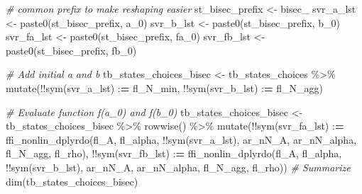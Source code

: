 \documentclass[
]{book}
\newenvironment{Shaded}{\begin{snugshade}}{\end{snugshade}}
\newcommand{\CommentTok}[1]{\textcolor[rgb]{0.56,0.35,0.01}{\textit{#1}}}
\newcommand{\ErrorTok}[1]{\textcolor[rgb]{0.64,0.00,0.00}{\textbf{#1}}}
\newcommand{\FunctionTok}[1]{\textcolor[rgb]{0.00,0.00,0.00}{#1}}
\newcommand{\NormalTok}[1]{#1}
\newcommand{\OtherTok}[1]{\textcolor[rgb]{0.56,0.35,0.01}{#1}}
\newcommand{\SpecialCharTok}[1]{\textcolor[rgb]{0.00,0.00,0.00}{#1}}
\newcommand{\StringTok}[1]{\textcolor[rgb]{0.31,0.60,0.02}{#1}}
\begin{document}
\begin{Shaded}
\begin{Highlighting}[]
\CommentTok{\# common prefix to make reshaping easier}
\NormalTok{st\_bisec\_prefix }\OtherTok{\textless{}{-}} \StringTok{\textquotesingle{}bisec\_\textquotesingle{}}
\NormalTok{svr\_a\_lst }\OtherTok{\textless{}{-}} \FunctionTok{paste0}\NormalTok{(st\_bisec\_prefix, }\StringTok{\textquotesingle{}a\_0\textquotesingle{}}\NormalTok{)}
\NormalTok{svr\_b\_lst }\OtherTok{\textless{}{-}} \FunctionTok{paste0}\NormalTok{(st\_bisec\_prefix, }\StringTok{\textquotesingle{}b\_0\textquotesingle{}}\NormalTok{)}
\NormalTok{svr\_fa\_lst }\OtherTok{\textless{}{-}} \FunctionTok{paste0}\NormalTok{(st\_bisec\_prefix, }\StringTok{\textquotesingle{}fa\_0\textquotesingle{}}\NormalTok{)}
\NormalTok{svr\_fb\_lst }\OtherTok{\textless{}{-}} \FunctionTok{paste0}\NormalTok{(st\_bisec\_prefix, }\StringTok{\textquotesingle{}fb\_0\textquotesingle{}}\NormalTok{)}

\CommentTok{\# Add initial a and b}
\NormalTok{tb\_states\_choices\_bisec }\OtherTok{\textless{}{-}}\NormalTok{ tb\_states\_choices }\SpecialCharTok{\%\textgreater{}\%}
  \FunctionTok{mutate}\NormalTok{(}\SpecialCharTok{!!}\FunctionTok{sym}\NormalTok{(svr\_a\_lst) }\SpecialCharTok{:}\ErrorTok{=}\NormalTok{ fl\_N\_min, }\SpecialCharTok{!!}\FunctionTok{sym}\NormalTok{(svr\_b\_lst) }\SpecialCharTok{:}\ErrorTok{=}\NormalTok{ fl\_N\_agg)}

\CommentTok{\# Evaluate function f(a\_0) and f(b\_0)}
\NormalTok{tb\_states\_choices\_bisec }\OtherTok{\textless{}{-}}\NormalTok{ tb\_states\_choices\_bisec }\SpecialCharTok{\%\textgreater{}\%}
  \FunctionTok{rowwise}\NormalTok{() }\SpecialCharTok{\%\textgreater{}\%}
  \FunctionTok{mutate}\NormalTok{(}\SpecialCharTok{!!}\FunctionTok{sym}\NormalTok{(svr\_fa\_lst) }\SpecialCharTok{:}\ErrorTok{=} \FunctionTok{ffi\_nonlin\_dplyrdo}\NormalTok{(fl\_A, fl\_alpha, }\SpecialCharTok{!!}\FunctionTok{sym}\NormalTok{(svr\_a\_lst),}
\NormalTok{                                                ar\_nN\_A, ar\_nN\_alpha,}
\NormalTok{                                                fl\_N\_agg, fl\_rho),}
         \SpecialCharTok{!!}\FunctionTok{sym}\NormalTok{(svr\_fb\_lst) }\SpecialCharTok{:}\ErrorTok{=} \FunctionTok{ffi\_nonlin\_dplyrdo}\NormalTok{(fl\_A, fl\_alpha, }\SpecialCharTok{!!}\FunctionTok{sym}\NormalTok{(svr\_b\_lst),}
\NormalTok{                                                ar\_nN\_A, ar\_nN\_alpha,}
\NormalTok{                                                fl\_N\_agg, fl\_rho))}
\CommentTok{\# Summarize}
\FunctionTok{dim}\NormalTok{(tb\_states\_choices\_bisec)}
\end{Highlighting}
\end{Shaded}
\end{document}
